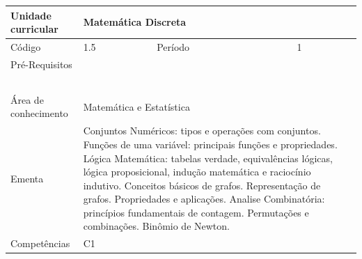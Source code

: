 \clearpage
\newpage

\begin{quadro}[ht!]
  \centering\scriptsize
\caption{Unidade Curricular Matemática Discreta}

\begin{tabular}{|p{2.5cm}|p{2.5cm}|p{2.5cm}|p{2.5cm}|p{2.5cm}|}\hline

  Unidade curricular & \multicolumn{4}{p{10cm}|}{ Matemática Discreta }\\\hline
  Código & 1.5 & Período & \multicolumn{2}{p{5cm}|}{ 1 }\\\hline
  Pré-Requisitos & \multicolumn{4}{p{10cm}|}{  } \\\hline
  \cellcolor{blue1}{ CH PRESENCIAL } &
    \cellcolor{blue1}{CH EAD Síncrona} &
    \cellcolor{blue1}{CH EAD Síncrona Mediada} &
    \cellcolor{blue1}{CH EAD Assíncrona} &
    \cellcolor{blue1}{CH APCC} \\\hline
  \cellcolor{blue1}{ 60 } &
    \cellcolor{blue1}{ 0 } &
    \cellcolor{blue1}{ 0 } &
    \cellcolor{blue1}{ 0 } &
    \cellcolor{blue1}{0} \\\hline
  \cellcolor{blue1}{ CH Teórica } &
    \cellcolor{blue1}{CH Prática} &
    \cellcolor{blue1}{CH Humanidades} &
    \cellcolor{blue1}{CH Extensão} &
    \cellcolor{blue1}{CH EAD TOTAL} \\\hline
  \cellcolor{blue1}{ 30 } &
    \cellcolor{blue1}{ 30 } &
    \cellcolor{blue1}{ 0 } &
    \cellcolor{blue1}{ 0 } &
    \cellcolor{blue1}{ 0 } \\\hline
  \cellcolor{blue1}{CARGA-HORÁRIA TOTAL} & \multicolumn{4}{p{10cm}|}{ \cellcolor{blue1}{ 60 } } \\\hline
  Área de conhecimento & \multicolumn{4}{p{10cm}|}{ Matemática e Estatística } \\\hline
  Ementa & \multicolumn{4}{p{10cm}|}{ Conjuntos Numéricos: tipos e operações com conjuntos. Funções de uma variável: principais funções e propriedades. Lógica Matemática: tabelas verdade, equivalências lógicas, lógica proposicional, indução matemática e raciocínio indutivo. Conceitos básicos de grafos. Representação de grafos. Propriedades e aplicações. Analise Combinatória: princípios fundamentais de contagem. Permutações e combinações. Binômio de Newton. } \\\hline
  Competências & \multicolumn{4}{p{10cm}|}{ C1 } \\\hline


  
	\end{tabular}

\end{quadro}


